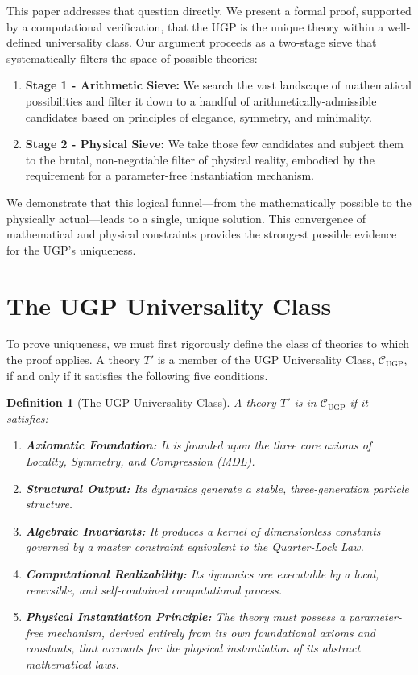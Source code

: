 \documentclass[11pt,twocolumn]{article}
\newtheorem{definition}[theorem]{Definition}
\theoremstyle{remark}
\begin{document}
This paper addresses that question directly. We present a formal proof, supported by a computational verification, that the UGP is the unique theory within a well-defined universality class. Our argument proceeds as a two-stage sieve that systematically filters the space of possible theories:
\begin{enumerate}
    \item \textbf{Stage 1 - Arithmetic Sieve:} We search the vast landscape of mathematical possibilities and filter it down to a handful of arithmetically-admissible candidates based on principles of elegance, symmetry, and minimality.
    \item \textbf{Stage 2 - Physical Sieve:} We take those few candidates and subject them to the brutal, non-negotiable filter of physical reality, embodied by the requirement for a parameter-free instantiation mechanism.
\end{enumerate}
We demonstrate that this logical funnel—from the mathematically possible to the physically actual—leads to a single, unique solution. This convergence of mathematical and physical constraints provides the strongest possible evidence for the UGP's uniqueness.

\section{The UGP Universality Class}
To prove uniqueness, we must first rigorously define the class of theories to which the proof applies. A theory $T'$ is a member of the UGP Universality Class, $\mathcal{C}_{\text{UGP}}$, if and only if it satisfies the following five conditions.

\begin{definition}[The UGP Universality Class]
\label{def:ugp_class}
A theory $T'$ is in $\mathcal{C}_{\text{UGP}}$ if it satisfies:
\begin{enumerate}[label=(\roman*)]
    \item \textbf{Axiomatic Foundation:} It is founded upon the three core axioms of Locality, Symmetry, and Compression (MDL).
    \item \textbf{Structural Output:} Its dynamics generate a stable, three-generation particle structure.
    \item \textbf{Algebraic Invariants:} It produces a kernel of dimensionless constants governed by a master constraint equivalent to the Quarter-Lock Law.
    \item \textbf{Computational Realizability:} Its dynamics are executable by a local, reversible, and self-contained computational process.
    \item \textbf{Physical Instantiation Principle:} The theory must possess a parameter-free mechanism, derived entirely from its own foundational axioms and constants, that accounts for the physical instantiation of its abstract mathematical laws.
\end{enumerate}
\end{definition}
\end{document}
